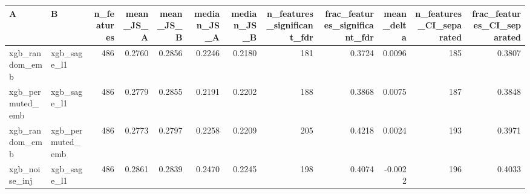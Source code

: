 \begin{tabular}{llrrrrrrrrrr}
\toprule
A & B & n\_features & mean\_JS\_A & mean\_JS\_B & median\_JS\_A & median\_JS\_B & n\_features\_significant\_fdr & frac\_features\_significant\_fdr & mean\_delta & n\_features\_CI\_separated & frac\_features\_CI\_separated \\
\midrule
xgb\_random\_emb & xgb\_sage\_l1 & 486 & 0.2760 & 0.2856 & 0.2246 & 0.2180 & 181 & 0.3724 & 0.0096 & 185 & 0.3807 \\
xgb\_permuted\_emb & xgb\_sage\_l1 & 486 & 0.2779 & 0.2855 & 0.2191 & 0.2202 & 188 & 0.3868 & 0.0075 & 187 & 0.3848 \\
xgb\_random\_emb & xgb\_permuted\_emb & 486 & 0.2773 & 0.2797 & 0.2258 & 0.2209 & 205 & 0.4218 & 0.0024 & 193 & 0.3971 \\
xgb\_noise\_inj & xgb\_sage\_l1 & 486 & 0.2861 & 0.2839 & 0.2470 & 0.2245 & 198 & 0.4074 & -0.0022 & 196 & 0.4033 \\
\bottomrule
\end{tabular}
